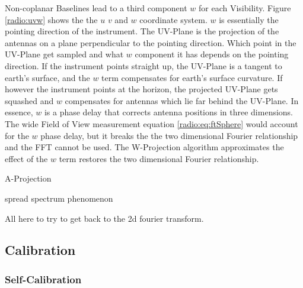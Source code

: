 Non-coplanar Baselines lead to a third component $w$ for each Visibility. Figure \ref{radio:uvw} shows the the $u$ $v$ and $w$ coordinate system. $w$ is essentially the pointing direction of the instrument. The UV-Plane is the projection of the antennas on a plane perpendicular to the pointing direction. Which point in the UV-Plane get sampled and what $w$ component it has depends on the pointing direction. If the instrument points straight up, the UV-Plane is a tangent to earth's surface, and the $w$ term compensates for earth's surface curvature. If however the instrument points at the horizon, the projected UV-Plane gets squashed and $w$ compensates for antennas which lie far behind the UV-Plane. In essence, $w$ is a phase delay that corrects antenna positions in three dimensions. The wide Field of View measurement equation \eqref{radio:eq:ftSphere} would account for the $w$ phase delay, but it breaks the the two dimensional Fourier relationship and the FFT cannot be used. The W-Projection \cite{cornwell2008noncoplanar} algorithm approximates the effect of the $w$ term restores the two dimensional Fourier relationship.

A-Projection \cite{bhatnagar2008correcting}


spread spectrum phenomenon

All here to try to get back to the 2d fourier transform. 




\subsection{Calibration}



\subsubsection{Self-Calibration}
